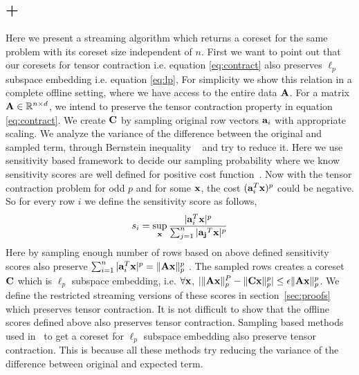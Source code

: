 \subsection{\online+\mrlw}
Here we present a streaming algorithm which returns a coreset for the same problem with its coreset size independent of $n$. First we want to point out that our coresets for tensor contraction i.e. equation \eqref{eq:contract} also preserves $\ell_p$ subspace embedding i.e. equation \eqref{eq:lp},
For simplicity we show this relation in a complete offline setting, where we have access to the entire data $\mathbf{A}$.
For a matrix $\mathbf{A} \in \mathbb{R}^{n \times d}$, we intend to preserve the tensor contraction property in equation \eqref{eq:contract}. We create $\mathbf{C}$ by sampling original row vectors $\mathbf{a}_{i}$ with appropriate scaling. 
We analyze the variance of the difference between the original and sampled term, through Bernstein inequality ~\cite{dubhashi2009concentration} and try to reduce it. 
Here we use sensitivity based framework to decide our sampling probability where we know sensitivity scores are well defined for positive cost function~\cite{langberg2010universal}. Now with the tensor contraction problem for odd $p$ and for some $\mathbf{x}$, the cost $(\mathbf{a}_{i}^{T}\mathbf{x})^{p}$ could be negative. So for every row $i$ we define the sensitivity score as follows,
\begin{equation}{\label{eqn:sensitivity}}
 s_{i} = \sup_{\mathbf{x}}\frac{|\mathbf{a}_{i}^{T}\mathbf{x}|^{p}}{\sum_{j=1}^{n}|\mathbf{a_{j}}^{T}\mathbf{x}|^{p}}
\end{equation}
Here by sampling enough number of rows based on above defined sensitivity scores also preserve $\sum_{i=1}^{n}|\mathbf{a}_{i}^{T}\mathbf{x}|^{p} = \|\mathbf{A}\mathbf{x}\|_{p}^{p}$ \cite{langberg2010universal}. The sampled rows creates a coreset $\mathbf{C}$ which is $\ell_{p}$ subspace embedding, i.e. $\forall \mathbf{x}$, $|\|\mathbf{A}\mathbf{x}\|_{p}^{P} - \|\mathbf{C}\mathbf{x}\|_{p}^{p}| \leq \epsilon \|\mathbf{A}\mathbf{x}\|_{p}^{p}$. We define the restricted streaming versions of these scores in section~\ref{sec:proofs} which preserves tensor contraction. It is not difficult to show that the offline scores defined above also preserves tensor contraction.
Sampling based methods used in~\cite{dasgupta2009sampling, cohen2015p, clarkson2016fast} to get a coreset for $\ell_{p}$ subspace embedding also preserve tensor contraction. This is because all these methods try reducing the variance of the difference between original and expected term.

